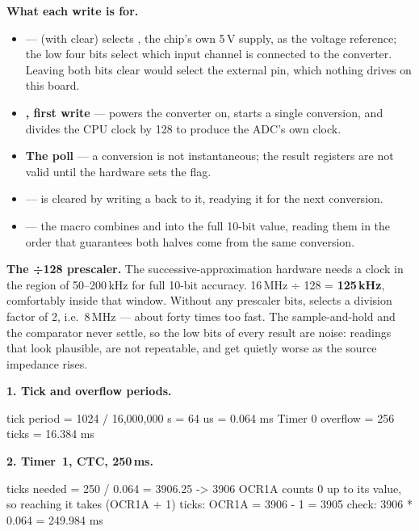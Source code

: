 \textbf{What each write is for.} 
\begin{itemize}
  \item \textbf{} ---  (with  clear) selects , the
    chip's own 5\,V supply, as the voltage reference; the low four bits select which input channel
    is connected to the converter. Leaving both  bits clear would select the external
     pin, which nothing drives on this board.
  \item \textbf{, first write} ---  powers the converter on, 
    starts a single conversion, and  divides the CPU clock by 128 to produce
    the ADC's own clock.
  \item \textbf{The  poll} --- a conversion is not instantaneous; the result registers
    are not valid until the hardware sets the flag.
  \item \textbf{} ---  is cleared by writing a 
    back to it, readying it for the next conversion.
  \item \textbf{} --- the  macro combines  and 
    into the full 10-bit value, reading them in the order that guarantees both halves come from the
    same conversion.
\end{itemize}

\textbf{The ÷128 prescaler.} The successive-approximation hardware needs a clock in the region of
50--200\,kHz for full 10-bit accuracy. 16\,MHz ÷ 128 = \textbf{125\,kHz}, comfortably inside that
window. Without any prescaler bits,  selects a division factor of 2, i.e.\
8\,MHz --- about forty times too fast. The sample-and-hold and the comparator never settle, so the
low bits of every result are noise: readings that look plausible, are not repeatable, and get
quietly worse as the source impedance rises. \worth{0.5}

\textbf{1. Tick and overflow periods.} 

\begin{console}
tick period = 1024 / 16,000,000 s = 64 us = 0.064 ms
Timer 0 overflow = 256 ticks = 16.384 ms
\end{console}

\textbf{2. Timer~1, CTC, 250\,ms.} 

\begin{console}
ticks needed = 250 / 0.064 = 3906.25  ->  3906
OCR1A counts 0 up to its value, so reaching it takes (OCR1A + 1) ticks:
OCR1A = 3906 - 1 = 3905
check: 3906 * 0.064 = 249.984 ms
\end{console}


